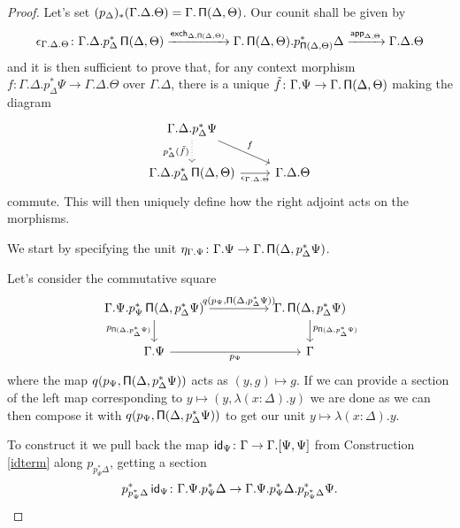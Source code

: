 \begin{proof}
  Let's set $(p_\Delta)_*(\Gamma.\Delta.\Theta)=\Gamma.\operatorname{\mathsf{\Pi}}(\Delta,\Theta)$. Our
  counit shall be given by
  \[\epsilon_{\Gamma.\Delta.\Theta}\colon\Gamma.\Delta.p^*_\Delta\operatorname{\mathsf{\Pi}}(\Delta,\Theta)
  \xrightarrow{\operatorname{\mathsf{exch}}_{\Delta,\operatorname{\mathsf{\Pi}}(\Delta,\Theta)}}\Gamma.\operatorname{\mathsf{\Pi}}(\Delta,\Theta).p^*_{\operatorname{\mathsf{\Pi}}(\Delta,\Theta)}\Delta
  \xrightarrow{\operatorname{\mathsf{app}}_{\Delta,\Theta}}\Gamma.\Delta.\Theta\]
  and it is then sufficient to prove that, for any context morphism
  $f\colon\Gamma.\Delta.p^*_\Delta\Psi\rightarrow\Gamma.\Delta.\Theta$ over
  $\Gamma.\Delta$, there is
  a unique $\tilde{f}\colon\Gamma.\Psi\rightarrow\Gamma.\operatorname{\mathsf{\Pi}}(\Delta,\Theta)$
  making the diagram
  \[\begin{tikzcd}
    {\Gamma.\Delta.p^*_\Delta\Psi} \\
    {\Gamma.\Delta.p^*_\Delta\Pis(\Delta,\Theta)} & {\Gamma.\Delta.\Theta}
    \arrow["f", from=1-1, to=2-2]
    \arrow["{\epsilon_{\Gamma.\Delta.\Theta}}"', from=2-1, to=2-2]
    \arrow["{p^*_\Delta(\tilde{f})}"', dotted, from=1-1, to=2-1]
  \end{tikzcd}\]
  commute. This will then uniquely define how the right adjoint acts on the
  morphisms.

\noindent
  We start by specifying the unit
  $\eta_{\Gamma.\Psi}\colon\Gamma.\Psi\rightarrow\Gamma.\operatorname{\mathsf{\Pi}}(\Delta,p^*_{\Delta}\Psi)$.

\noindent
  Let's consider the commutative square
  \[\begin{tikzcd}[column sep=huge]
    {\Gamma.\Psi.p^*_\Psi\Pis(\Delta,p^*_\Delta\Psi)} & {\Gamma.\Pis(\Delta,p^*_\Delta\Psi)} \\
    {\Gamma.\Psi} & \Gamma
    \arrow["{p_{\Pis(\Delta,p^*_\Delta\Psi)}}"', from=1-1, to=2-1]
    \arrow["{p_{\Psi}}"', from=2-1, to=2-2]
    \arrow["{p_{\Pis(\Delta,p^*_\Delta\Psi)}}", from=1-2, to=2-2]
    \arrow["{q(p_\Psi,\Pis(\Delta,p^*_\Delta\Psi))}", from=1-1, to=1-2]
  \end{tikzcd}\]
  where the map $q(p_\Psi,\operatorname{\mathsf{\Pi}}(\Delta,p^*_\Delta\Psi))$ acts as $(y,g)\mapsto
  g$. If we can provide a section of the left map
  corresponding to $y\mapsto(y,\lambda(x:\Delta).y)$ we are
  done as we can then compose
  it with $q(p_\Psi,\operatorname{\mathsf{\Pi}}(\Delta,p^*_\Delta\Psi))$ to get our unit
  $y\mapsto\lambda(x:\Delta).y$.
  
\noindent
  To construct it we pull back the map
  $\operatorname{\mathsf{id}}_{\Psi}\colon\Gamma\rightarrow\Gamma.[\Psi,\Psi]$ from Construction
  \ref{idterm} along $p_{p^*_\Psi\Delta}$, getting a section
  \[p^*_{p^*_\Psi\Delta}\operatorname{\mathsf{id}}_{\Psi}\colon\Gamma.\Psi.p^*_\Psi\Delta\rightarrow\Gamma.\Psi.p^*_\Psi\Delta.p^*_{p^*_\Psi\Delta}\Psi.\]


\end{proof}

